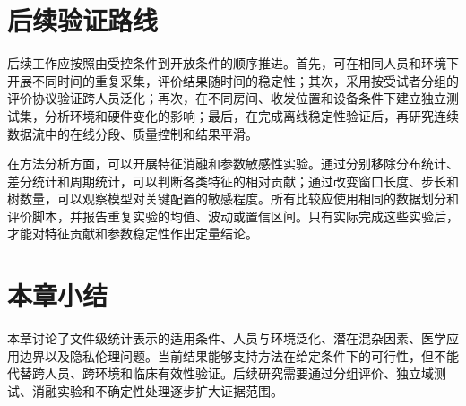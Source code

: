 \section{后续验证路线}
后续工作应按照由受控条件到开放条件的顺序推进。首先，可在相同人员和环境下开展不同时间的重复采集，评价结果随时间的稳定性；其次，采用按受试者分组的评价协议验证跨人员泛化；再次，在不同房间、收发位置和设备条件下建立独立测试集，分析环境和硬件变化的影响；最后，在完成离线稳定性验证后，再研究连续数据流中的在线分段、质量控制和结果平滑。

在方法分析方面，可以开展特征消融和参数敏感性实验。通过分别移除分布统计、差分统计和周期统计，可以判断各类特征的相对贡献；通过改变窗口长度、步长和树数量，可以观察模型对关键配置的敏感程度。所有比较应使用相同的数据划分和评价脚本，并报告重复实验的均值、波动或置信区间。只有实际完成这些实验后，才能对特征贡献和参数稳定性作出定量结论。

\section{本章小结}
本章讨论了文件级统计表示的适用条件、人员与环境泛化、潜在混杂因素、医学应用边界以及隐私伦理问题。当前结果能够支持方法在给定条件下的可行性，但不能代替跨人员、跨环境和临床有效性验证。后续研究需要通过分组评价、独立域测试、消融实验和不确定性处理逐步扩大证据范围。
